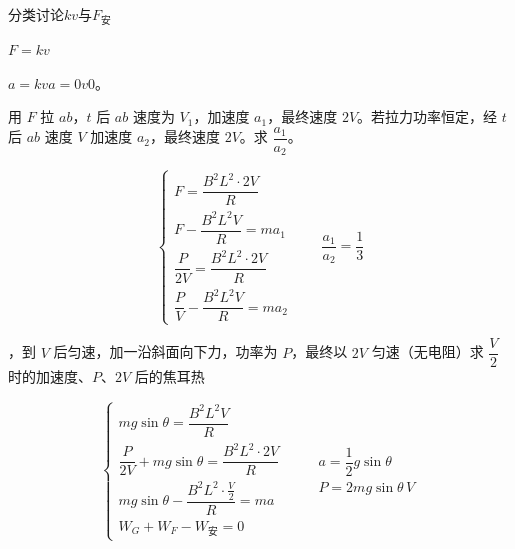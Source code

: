 分类讨论\quad $kv$与$F_{\text{安}}$


$F=kv$



$a=kv$\qquad $a=0$\qquad $v$$0$。

\begin{problem}[③]
用 $F$ 拉 $ab$，$t$ 后 $ab$ 速度为 $V_1$，加速度 $a_1$，最终速度 $2V$。若拉力功率恒定，经 $t$ 后 $ab$ 速度 $V$ 加速度 $a_2$，最终速度 $2V$。求 $\dfrac{a_1}{a_2}$。 %
\begin{solution}
\[ \left\{\begin{array}{l}
F=\dfrac{B^2L^2\cdot 2V}{R}\\[2.5ex]
F-\dfrac{B^2L^2V}{R}=ma_1\\[2.5ex]
\dfrac{P}{2V}=\dfrac{B^2L^2\cdot 2V}{R}\\[2.5ex]
\dfrac{P}{V}-\dfrac{B^2L^2V}{R}=ma_2
\end{array}\right.\qquad \frac{a_1}{a_2}=\frac{1}{3} \]
\end{solution}
\end{problem}

\begin{problem}[④]
，到 $V$ 后匀速，加一沿斜面向下力，功率为 $P$，最终以 $2V$ 匀速（无电阻）\quad 求 $\dfrac{V}{2}$ 时的加速度、$P$、$2V$ 后的焦耳热
\begin{solution}
\[ \left\{\begin{array}{l}
mg\sin\theta=\dfrac{B^2L^2V}{R}\\[2.5ex]
\dfrac{P}{2V}+mg\sin\theta=\dfrac{B^2L^2\cdot 2V}{R}\\[2.5ex]
mg\sin\theta-\dfrac{B^2L^2\cdot\frac{V}{2}}{R}=ma\\[2.5ex]
W_G+W_F-W_{\text{安}}=0
\end{array}\right.\qquad \begin{array}{l}a=\dfrac{1}{2}g\sin\theta\\[2ex] P=2mg\sin\theta\,V\end{array} \] %
\end{solution}
\end{problem}

